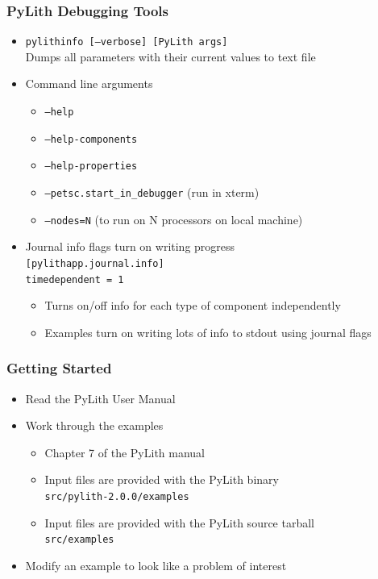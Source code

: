 \documentclass{beamer}
\newcommand{\important}[1]{{\color{red}#1}}
\begin{document}
\begin{frame}
  \frametitle{PyLith Debugging Tools}
  \summary{}

  \begin{itemize}
  \item {\tt pylithinfo [--verbose] [PyLith args]}\\
    Dumps all parameters with their current values to text file
  \item Command line arguments
    \begin{itemize}
    \item {\tt --help}
    \item {\tt --help-components}
    \item {\tt --help-properties}
    \item {\tt --petsc.start\_in\_debugger} (run in xterm)
    \item {\tt --nodes=N} (to run on N processors on local machine)
    \end{itemize}
  \item Journal info flags turn on writing progress\\
    {\tt [pylithapp.journal.info]}\\
    {\tt timedependent = 1} \\
    \begin{itemize}
    \item Turns on/off info for each type of component independently
    \item Examples turn on writing lots of info to stdout using journal flags
    \end{itemize}
  \end{itemize}

\end{frame}


\begin{frame}
  \frametitle{Getting Started}
  \summary{}

  \begin{itemize}
  \item Read the PyLith User Manual
  \item Work through the examples
    \begin{itemize}
    \item \important{Chapter 7} of the PyLith manual
    \item Input files are provided with the PyLith binary\\
      {\tt \important{src/pylith-2.0.0/examples}}
    \item Input files are provided with the PyLith source tarball\\
      {\tt \important{src/examples}}
    \end{itemize}
  \item Modify an example to look like a problem of interest
  \end{itemize}

\end{frame}
\end{document}
